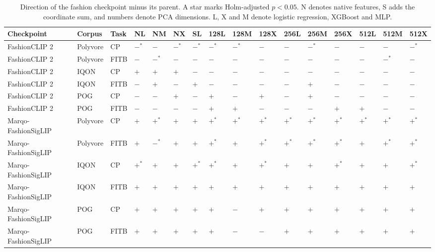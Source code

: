 \begin{table}[htbp]\centering\small\setlength{\tabcolsep}{2pt}
\caption{Direction of the fashion checkpoint minus its parent. A star marks Holm-adjusted $p<0.05$. N denotes native features, S adds the coordinate sum, and numbers denote PCA dimensions. L, X and M denote logistic regression, XGBoost and MLP.}\label{tab:signs}
\begin{adjustbox}{max width=\linewidth}\begin{tabular}{llllllllllllllll}\toprule
Checkpoint & Corpus & Task & NL & NM & NX & SL & 128L & 128M & 128X & 256L & 256M & 256X & 512L & 512M & 512X\\\midrule
FashionCLIP 2 & Polyvore & CP & $-^{*}$ & $-$ & $-^{*}$ & $-^{*}$ & $-^{*}$ & $-^{*}$ & $-$ & $-$ & $-^{*}$ & $-$ & $-$ & $-$ & $-^{*}$\\
FashionCLIP 2 & Polyvore & FITB & $-$ & $-^{*}$ & $-$ & $-$ & $-$ & $-$ & $-$ & $-$ & $-$ & $-$ & $-$ & $-^{*}$ & $-$\\
FashionCLIP 2 & IQON & CP & $+$ & $+$ & $+$ & $-$ & $-$ & $-$ & $-$ & $-$ & $-$ & $-$ & $-$ & $-$ & $-$\\
FashionCLIP 2 & IQON & FITB & $-$ & $+$ & $-$ & $+$ & $-$ & $-$ & $-$ & $-$ & $+$ & $-$ & $-$ & $-$ & $-$\\
FashionCLIP 2 & POG & CP & $-$ & $-$ & $+$ & $-$ & $+$ & $-$ & $+$ & $-$ & $+$ & $-$ & $-$ & $-$ & $-$\\
FashionCLIP 2 & POG & FITB & $-$ & $-$ & $-$ & $-$ & $+$ & $+$ & $-$ & $-$ & $-$ & $+$ & $+$ & $-$ & $-$\\
Marqo-FashionSigLIP & Polyvore & CP & $+$ & $+^{*}$ & $+$ & $+$ & $+^{*}$ & $+^{*}$ & $+^{*}$ & $+^{*}$ & $+^{*}$ & $+^{*}$ & $+^{*}$ & $+^{*}$ & $+^{*}$\\
Marqo-FashionSigLIP & Polyvore & FITB & $+$ & $-^{*}$ & $+$ & $+$ & $+^{*}$ & $+$ & $+^{*}$ & $+^{*}$ & $+^{*}$ & $+^{*}$ & $+$ & $+^{*}$ & $+^{*}$\\
Marqo-FashionSigLIP & IQON & CP & $+^{*}$ & $+$ & $+$ & $+^{*}$ & $+^{*}$ & $+$ & $+^{*}$ & $+$ & $+$ & $+^{*}$ & $+$ & $+$ & $+^{*}$\\
Marqo-FashionSigLIP & IQON & FITB & $+$ & $+$ & $+$ & $+$ & $+$ & $+$ & $+$ & $+$ & $+$ & $+$ & $+$ & $+$ & $+$\\
Marqo-FashionSigLIP & POG & CP & $+$ & $+$ & $+$ & $+$ & $+$ & $-$ & $+$ & $+$ & $+$ & $+$ & $+$ & $+$ & $+$\\
Marqo-FashionSigLIP & POG & FITB & $+$ & $+$ & $+$ & $+$ & $+$ & $-$ & $-$ & $+$ & $+$ & $+$ & $+$ & $+$ & $+$\\

\end{tabular}
\end{adjustbox}
\end{table}
